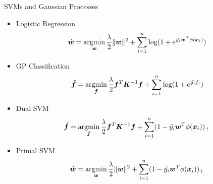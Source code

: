 \documentclass[10pt,mathserif]{beamer}
\begin{document}
\begin{frame}{SVMs and Gaussian Processes}
\begin{itemize}
    \item Logistic Regression
    \begin{equation*}
        \hat{\bm{w}} = \mathop{\rm argmin}_{\bm{w}} \frac{\lambda}{2}\|\bm{w}\|^2 + \sum_{i=1}^n \log(1+ e^{\tilde{y_i} \bm{w}^T\phi(\bm{x}_i)})
    \end{equation*}
    \item GP Classification
    \begin{equation*}
        \hat{\bm{f}} = \mathop{\rm argmin}_{\bm{f}} \frac{\lambda}{2}\bm{f}^T \bm{K}^{-1}\bm{f} + \sum_{i=1}^n \log(1+ e^{\tilde{y_i} f_i})
    \end{equation*}
    \item Dual SVM
    \begin{equation*}
        \hat{\bm{f}} = \mathop{\rm argmin}_{\bm{f}} \frac{\lambda}{2}\bm{f}^T \bm{K}^{-1}\bm{f} + \sum_{i=1}^n (1-\tilde{y_i} \bm{w}^T\phi(\bm{x}_i))_+
    \end{equation*}
    \item Primal SVM
    \begin{equation*}
        \hat{\bm{w}} = \mathop{\rm argmin}_{\bm{w}} \frac{\lambda}{2}\|\bm{w}\|^2 + \sum_{i=1}^n (1-\tilde{y_i} \bm{w}^T\phi(\bm{x}_i))_+
    \end{equation*}
\end{itemize}
\end{frame}
\end{document}
